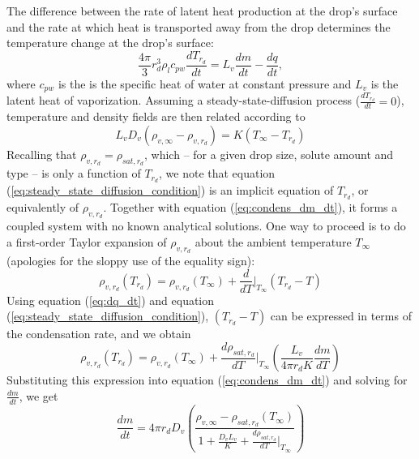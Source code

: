 \documentclass{report}
\begin{document}
The difference between the rate of latent heat production at the drop's surface and the rate at which heat is transported away from the drop determines the temperature change at the drop's surface:
\begin{equation}
\frac{4 \pi}{3} r_d^3 \rho_l c_{pw} \frac{dT_{r_d}}{dt} = L_v \frac{dm}{dt} - \frac{dq}{dt},
\label{eq:dT_dt_at_drop_surface}
\end{equation}
where $c_{pw}$ is the is the specific heat of water at constant pressure and $L_v$ is the latent heat of vaporization. Assuming a steady-state-diffusion process ($\frac{dT_{r_d}}{dt} = 0$), temperature and density fields are then related according to
\begin{equation}
L_v D_v  (\rho_{v, \infty} - \rho_{v, r_d}) = K (T_{\infty} - T_{r_d})
\label{eq:steady_state_diffusion_condition}
\end{equation}
Recalling that $\rho_{v, r_d}=\rho_{sat, r_d}$, which -- for a given drop size, solute amount and type -- is only a function of $T_{r_d}$, we note that equation (\ref{eq:steady_state_diffusion_condition}) is an implicit
equation of $T_{r_d}$, or equivalently of $\rho_{v, r_d}$. Together with equation (\ref{eq:condens_dm_dt}), it forms a coupled system with no known analytical solutions. One way to proceed is to do a first-order Taylor expansion of $\rho_{v, r_d}$ about the ambient temperature $T_{\infty}$ (apologies for the sloppy use of the equality sign):
\begin{equation}
    \rho_{v, r_d}(T_{r_d}) = \rho_{v, r_d}(T_{\infty}) + \frac{d}{dT}\biggr\rvert_{T_{\infty}} (T_{r_d} - T)
\end{equation}
Using equation (\ref{eq:dq_dt}) and equation (\ref{eq:steady_state_diffusion_condition}), $(T_{r_d} - T)$ can be expressed in terms of the condensation rate, and we obtain 
\begin{equation}
    \rho_{v, r_d}(T_{r_d}) = \rho_{v, r_d}(T_{\infty}) + \frac{d\rho_{sat, r_d}}{dT}\biggr\rvert_{T_{\infty}} \left(\frac{L_v}{4\pi r_d K}\frac{dm}{dT}\right)
\end{equation}
Substituting this expression into equation (\ref{eq:condens_dm_dt}) and solving for $\frac{dm}{dt}$, we get
\begin{equation}
    \frac{dm}{dt} = 4 \pi r_d D_v \left(\frac{\rho_{v, \infty} - \rho_{sat, r_d}(T_\infty)}{1 + \frac{D_v L_v}{K} + \frac{d\rho_{sat, r_d}}{dT}\rvert_{T_{\infty}}}\right)
\end{equation}
\end{document}
